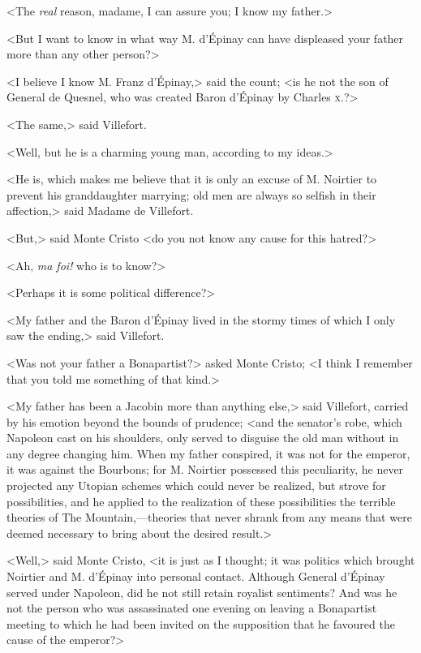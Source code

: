  <The \textit{real} reason, madame, I can assure you; I know my father.> 

 <But I want to know in what way M. d'Épinay can have displeased your father more than any other person?> 

 <I believe I know M. Franz d'Épinay,> said the count; <is he not the son of General de Quesnel, who was created Baron d'Épinay by Charles \textsc{x.}?> 

 <The same,> said Villefort. 

 <Well, but he is a charming young man, according to my ideas.> 

 <He is, which makes me believe that it is only an excuse of M. Noirtier to prevent his granddaughter marrying; old men are always so selfish in their affection,> said Madame de Villefort. 

 <But,> said Monte Cristo <do you not know any cause for this hatred?> 

 <Ah, \textit{ma foi!} who is to know?> 

 <Perhaps it is some political difference?> 

 <My father and the Baron d'Épinay lived in the stormy times of which I only saw the ending,> said Villefort. 

 <Was not your father a Bonapartist?> asked Monte Cristo; <I think I remember that you told me something of that kind.> 

 <My father has been a Jacobin more than anything else,> said Villefort, carried by his emotion beyond the bounds of prudence; <and the senator's robe, which Napoleon cast on his shoulders, only served to disguise the old man without in any degree changing him. When my father conspired, it was not for the emperor, it was against the Bourbons; for M. Noirtier possessed this peculiarity, he never projected any Utopian schemes which could never be realized, but strove for possibilities, and he applied to the realization of these possibilities the terrible theories of The Mountain,—theories that never shrank from any means that were deemed necessary to bring about the desired result.> 

 <Well,> said Monte Cristo, <it is just as I thought; it was politics which brought Noirtier and M. d'Épinay into personal contact. Although General d'Épinay served under Napoleon, did he not still retain royalist sentiments? And was he not the person who was assassinated one evening on leaving a Bonapartist meeting to which he had been invited on the supposition that he favoured the cause of the emperor?> 

